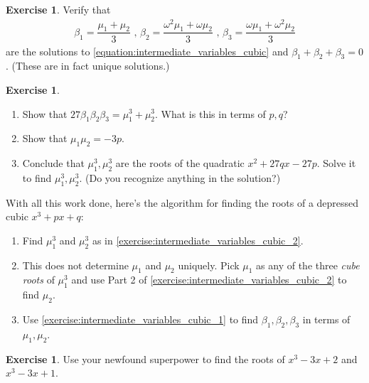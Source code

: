 \documentclass[reqno, 12pt, letter]{article}
\theoremstyle{plain}
\theoremstyle{definition}
\newtheorem{exercise}[theorem]{Exercise}
\theoremstyle{remark}
\numberwithin{equation}{section}
\begin{document}
	\begin{exercise}
		\label{exercise:intermediate_variables_cubic_1}
		Verify that
		\begin{align*}
			\beta_1 = \dfrac{\mu_1 + \mu_2}{3} 
			\mbox { , } \beta_2 = \dfrac{\omega^2 \mu_1 + \omega \mu_2}{3}
			\mbox { , } \beta_3 = \dfrac{\omega \mu_1 + \omega^2 \mu_2}{3}
		\end{align*}
		are the solutions to \autoref{equation:intermediate_variables_cubic} and $ \beta_1 + \beta_2 + \beta_3 = 0$. (These are in fact unique solutions.)
	\end{exercise}
	


	\begin{exercise}
		\label{exercise:intermediate_variables_cubic_2}
		$ $ 
		\begin{enumerate}
			\item Show that $27\beta_1  \beta_2  \beta_3 = \mu_1^3 + \mu_2^3$. What is this in terms of $ p, q$?
			\item Show that $ \mu_1 \mu_2 = -3p$.
			\item Conclude that $ \mu_1^3, \mu_2^3$ are the roots of the quadratic $ x^2 + 27qx - 27p$. Solve it to find $ \mu_1^3, \mu_2^3$. (Do you recognize anything in the solution?)
		\end{enumerate}
	\end{exercise}
	
	\begin{mdframed}
		With all this work done, here's the algorithm for finding the roots of a depressed cubic $ x^3 + px + q$:
		\begin{enumerate}
			\item Find $ \mu_1^3$ and $ \mu_2^3$ as in \autoref{exercise:intermediate_variables_cubic_2}.
			\item This does not determine $ \mu_1$ and $ \mu_2$ uniquely. Pick $ \mu_1$ as any of the three \emph{cube roots} of $ \mu_1^3$ and use Part 2 of \autoref{exercise:intermediate_variables_cubic_2} to find $ \mu_2$.
			\item Use \autoref{exercise:intermediate_variables_cubic_1} to find $ \beta_1, \beta_2, \beta_3$ in terms of $ \mu_1, \mu_2$. 
		\end{enumerate}
	\end{mdframed}
		\begin{exercise}
			Use your newfound superpower to find the roots of $x^3 - 3x + 2$ and $x^3 - 3x + 1$.
		\end{exercise}
		
\end{document}
